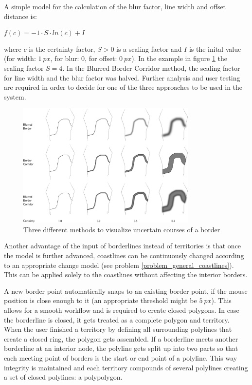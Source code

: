 A simple model for the calculation of the blur factor, line width and offset distance is:
\begin{center}
\begin{math}
    f(c) = -1 \cdot S \cdot ln(c) + I
\end{math}
\end{center}
where $c$ is the certainty factor, $S>0$ is a scaling factor and $I$ is the inital value (for width: $1~px$, for blur: $0$, for offset: $0~px$). In the example in figure \ref{fig:uncertainty_border} the scaling factor $S=4$. In the Blurred Border Corridor method, the scaling factor for line width and the blur factor was halved. Further analysis and user testing are required in order to decide for one of the three approaches to be used in the system.

\begin{figure}[H]
  \centering
  \includegraphics[width = 0.8\textwidth]{graphics/uncertainty/border}
  \caption{Three different methods to visualize uncertain courses of a border}
  \label{fig:uncertainty_border}
\end{figure}

Another advantage of the input of borderlines instead of territories is that once the model is further advanced, coastlines can be continuously changed according to an appropriate change model (see problem \ref{problem_general_coastlines}). This can be applied solely to the coastlines without affecting the interior borders.

A new border point automatically snaps to an existing border point, if the mouse position is close enough to it (an appropriate threshold might be $5~px$). This allows for a smooth workflow and is required to create closed polygons. In case the borderline is closed, it gets treated as a complete polygon and territory. When the user finished a territory by defining all surrounding polylines that create a closed ring, the polygon gets assembled. If a borderline meets another borderline at an interior node, the polyline gets split up into two parts so that each meeting point of borders is the start or end point of a polyline. This way integrity is maintained and each territory compounds of several polylines creating a set of closed polylines: a polypolygon.


